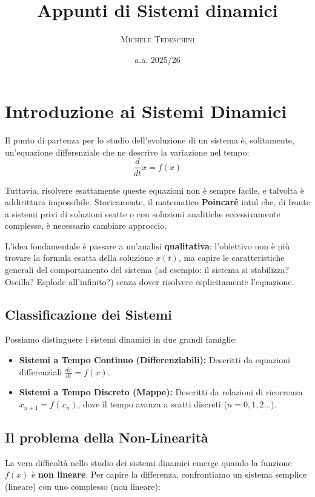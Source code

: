 \documentclass[openany]{book}
\title{\textbf{\Huge Appunti di Sistemi dinamici}}
\author{\textsc{Michele Tedeschini}}
\date{a.a. 2025/26}
\theoremstyle{definition}
\theoremstyle{remark}
\begin{document}
\pagestyle{empty}
\maketitle
\thispagestyle{empty}

\tableofcontents
\thispagestyle{empty}
\newpage
\pagestyle{fancy}

\section{Introduzione ai Sistemi Dinamici}

Il punto di partenza per lo studio dell'evoluzione di un sistema è, solitamente, un'equazione differenziale che ne descrive la variazione nel tempo:
\begin{equation}
    \frac{d}{dt} x = f(x)
\end{equation}

Tuttavia, risolvere esattamente queste equazioni non è sempre facile, e talvolta è addirittura impossibile. Storicamente, il matematico \textbf{Poincaré} intuì che, di fronte a sistemi privi di soluzioni esatte o con soluzioni analitiche eccessivamente complesse, è necessario cambiare approccio.

L'idea fondamentale è passare a un'analisi \textbf{qualitativa}: l'obiettivo non è più trovare la formula esatta della soluzione $x(t)$, ma capire le caratteristiche generali del comportamento del sistema (ad esempio: il sistema si stabilizza? Oscilla? Esplode all'infinito?) senza dover risolvere esplicitamente l'equazione.

\subsection{Classificazione dei Sistemi}
Possiamo distinguere i sistemi dinamici in due grandi famiglie:
\begin{itemize}
    \item \textbf{Sistemi a Tempo Continuo (Differenziabili):} Descritti da equazioni differenziali $\displaystyle \frac{dx}{dt} = f(x)$.
    \item \textbf{Sistemi a Tempo Discreto (Mappe):} Descritti da relazioni di ricorrenza $x_{n+1} = f(x_n)$, dove il tempo avanza a scatti discreti ($n=0, 1, 2...$).
\end{itemize}

\subsection{Il problema della Non-Linearità}
La vera difficoltà nello studio dei sistemi dinamici emerge quando la funzione $f(x)$ è \textbf{non lineare}.
Per capire la differenza, confrontiamo un sistema semplice (lineare) con uno complesso (non lineare):
\end{document}
